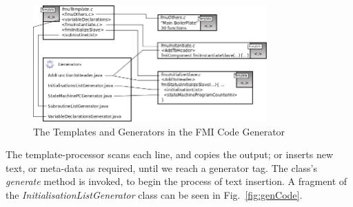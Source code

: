 \documentclass{llncs}%
\begin{document}
%
\begin{figure}[t]
\vspace*{-12pt}
\centering
\includegraphics[width=0.8\textwidth]{templateStructure.png}
\caption{The Templates and Generators in the FMI Code Generator}
\label{fig:templateStructure}
\vspace*{-12pt}
\end{figure}
%
The template-processor scans each line, and copies the output; or inserts new text, or meta-data as required, until we reach a generator tag. The class's \emph{generate} method is invoked, to begin the process of text insertion. A fragment of the \emph{InitialisationListGenerator} class can be seen in Fig.~\ref{fig:genCode}. 
%
%
\end{document}
